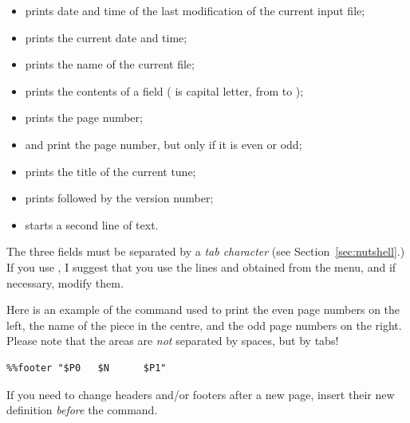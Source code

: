\documentclass[a4paper,fullpage,12pt]{book}
\begin{document}
\begin{itemize}

  \item {} prints date and time of the last modification of the
  current input file;
  
  \item {} prints the current date and time;
  
  \item {} prints the name of the current file;
  
  \item {} prints the contents of a field ( is
  capital letter, from  to );
  
  \item {} prints the page number;
  
  \item {} and  print the page number, but only if it is
  even or odd;
  
  \item {} prints the title of the current tune;
  
  \item {} prints  followed by the version number;
  
  \item {} starts a second line of text.
  
\end{itemize}

The three fields must be separated by a \emph{tab character} (see
Section~\ref{sec:nutshell}.) If you use \jedabc{}, I suggest that you
use the lines  and  obtained from the
 menu, and if necessary,
modify them.

Here is an example of the command  used to print the
even page numbers on the left, the name of the piece in the centre,
and the odd page numbers on the right. Please note that the areas are
\emph{not} separated by spaces, but by tabs!

\begin{verbatim}
%%footer "$P0   $N      $P1"
\end{verbatim}

\begin{note}

  If you need to change headers and/or footers after a new page, insert
  their new definition \emph{before} the  command.

\end{note}
\end{document}
